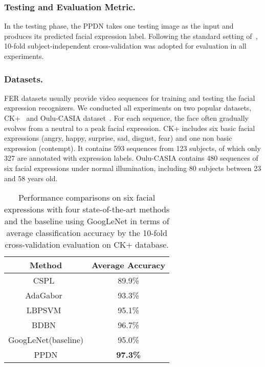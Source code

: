 \documentclass[runningheads]{llncs}
\begin{document}
\subsubsection{Testing and Evaluation Metric.}

In the testing phase, the PPDN takes one testing image as the input 
and produces its predicted facial expression label. Following the 
standard setting of~\cite{zhong2012learning,shan2009facial}, 10-fold 
subject-independent cross-validation was adopted for evaluation in all 
experiments. 

\subsubsection{Datasets.} FER datasets usually provide video sequences for 
training and testing the facial expression recognizers. We conducted all 
experiments on two popular datasets, CK+~\cite{lucey2010extended} and  
Oulu-CASIA dataset~\cite{zhao2011facial}. For each sequence, the face 
often gradually evolves from a neutral to a peak facial expression. 
CK+ includes six basic facial expressions (angry, happy, surprise, sad, 
disgust, fear) and one non basic expression (contempt).  It contains 
593 sequences from 123 subjects, of which only 327 are annotated with 
expression labels. Oulu-CASIA contains 480 sequences of six facial 
expressions under normal illumination, including 80 subjects between 23 
and 58 years old. 

\begin{table}[!tp]
	\begin{center}
		\caption{Performance comparisons on six facial expressions with four state-of-the-art methods and the baseline using GoogLeNet in terms of average classification accuracy by the 10-fold cross-validation evaluation on CK+ database.}
		\label{table:ckcom_image}
		\begin{tabular}{c|c}
			\hline\noalign{\smallskip}
			Method & Average Accuracy\\
			
			\hline
			
			CSPL~\cite{zhong2012learning}  & 89.9\% \\
			AdaGabor~\cite{bartlett2005recognizing}&  93.3\% \\
			LBPSVM~\cite{shan2009facial} &  95.1\%\\
			BDBN~\cite{liu2014facial}& 96.7\% \\
			GoogLeNet(baseline) & 95.0\% \\
			\hline
			PPDN& \textbf{97.3\%} \\
			\hline
		\end{tabular}
	\end{center}
\end{table}
\end{document}
